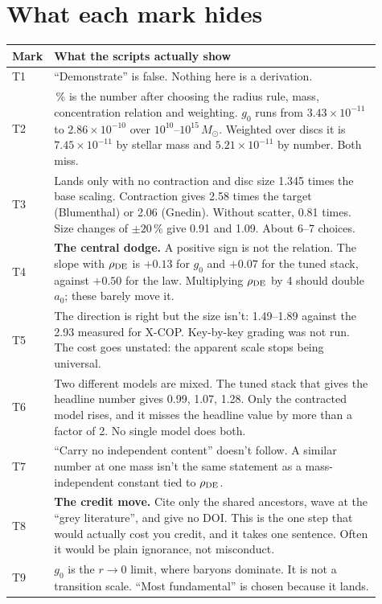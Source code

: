 \documentclass[10pt]{article}
\begin{document}
\section*{What each mark hides}
\small
\begin{tabular}{@{}l>{\raggedright\arraybackslash}p{0.91\linewidth}@{}}
\toprule
\textbf{Mark} & \textbf{What the scripts actually show} \\ \midrule
T1 & ``Demonstrate'' is false. Nothing here is a derivation. \\
T2 & 2\,\% is the number after choosing the radius rule, mass, concentration relation and weighting. $g_0$ runs from $3.43\times10^{-11}$ to $2.86\times10^{-10}$ over $10^{10}$--$10^{15}\,M_\odot$. Weighted over discs it is $7.45\times10^{-11}$ by stellar mass and $5.21\times10^{-11}$ by number. Both miss. \\
T3 & Lands only with no contraction and disc size 1.345 times the base scaling. Contraction gives 2.58 times the target (Blumenthal) or 2.06 (Gnedin). Without scatter, 0.81 times. Size changes of $\pm20$\,\% give 0.91 and 1.09. About 6--7 choices. \\
T4 & \textbf{The central dodge.} A positive sign is not the relation. The slope with $\rho_{\rm DE}$ is $+0.13$ for $g_0$ and $+0.07$ for the tuned stack, against $+0.50$ for the law. Multiplying $\rho_{\rm DE}$ by 4 should double $a_0$; these barely move it. \\
T5 & The direction is right but the size isn't: 1.49--1.89 against the 2.93 measured for X-COP. Key-by-key grading was not run. The cost goes unstated: the apparent scale stops being universal. \\
T6 & Two different models are mixed. The tuned stack that gives the headline number gives 0.99, 1.07, 1.28. Only the contracted model rises, and it misses the headline value by more than a factor of 2. No single model does both. \\
T7 & ``Carry no independent content'' doesn't follow. A similar number at one mass isn't the same statement as a mass-independent constant tied to $\rho_{\rm DE}$. \\
T8 & \textbf{The credit move.} Cite only the shared ancestors, wave at the ``grey literature'', and give no DOI. This is the one step that would actually cost you credit, and it takes one sentence. Often it would be plain ignorance, not misconduct. \\
T9 & $g_0$ is the $r\to0$ limit, where baryons dominate. It is not a transition scale. ``Most fundamental'' is chosen because it lands. \\

\end{tabular}
\end{document}
